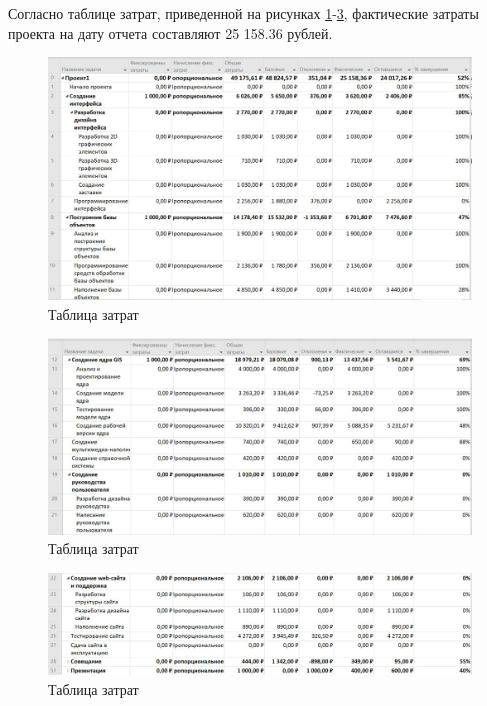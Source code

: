 Согласно таблице затрат, приведенной на рисунках \ref{img:costs1}-\ref{img:costs3}, фактические затраты проекта на дату отчета составляют 25 158.36 рублей.

\begin{figure}[H]
	\begin{center}
		\includegraphics[scale=0.45]{inc/img/costs1.jpg}
	\end{center}
	\captionsetup{justification=centering}
	\caption{Таблица затрат}
	\label{img:costs1}
\end{figure}

\begin{figure}[H]
	\begin{center}
		\includegraphics[scale=0.45]{inc/img/costs2.jpg}
	\end{center}
	\captionsetup{justification=centering}
	\caption{Таблица затрат}
	\label{img:costs2}
\end{figure}

\begin{figure}[H]
	\begin{center}
		\includegraphics[scale=0.45]{inc/img/costs3.jpg}
	\end{center}
	\captionsetup{justification=centering}
	\caption{Таблица затрат}
	\label{img:costs3}
\end{figure}

